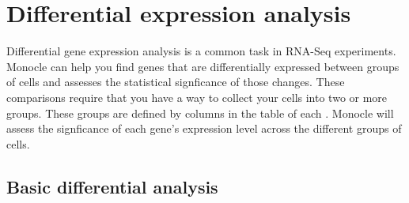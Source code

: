 \documentclass[10pt,oneside]{article}\usepackage[]{graphicx}\usepackage[]{color}
\begin{document}
% 
% 

\section{Differential expression analysis}

Differential gene expression analysis is a common task in RNA-Seq experiments.  Monocle can help you find genes that are differentially expressed between groups of cells and assesses the statistical signficance of those changes. These comparisons require that you have a way to collect your cells into two or more groups.  These groups are defined by columns in the  table of each .  Monocle will assess the signficance of each gene's expression level across the different groups of cells.

\subsection{Basic differential analysis}
\end{document}
